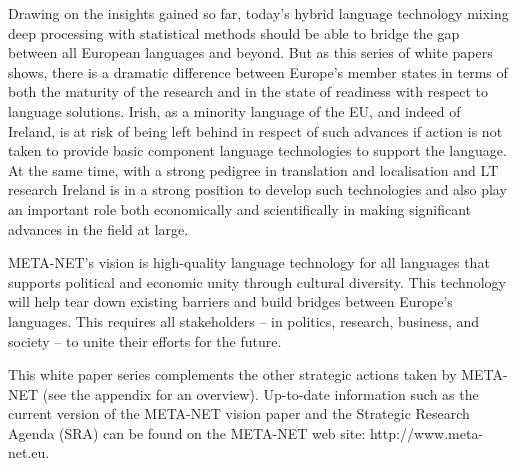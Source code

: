 \begin{multicols}{2}

Drawing on the insights gained so far, today’s hybrid language technology mixing deep processing with statistical methods should be able to bridge the gap between all European languages and beyond. But as this series of white papers shows, there is a dramatic difference between Europe's member states in terms of both the maturity of the research and in the state of readiness with respect to language solutions. Irish, as a minority language of the EU, and indeed of Ireland, is at risk of being left behind in respect of such advances if action is not taken to provide basic component language technologies to support the language. At the same time, with a strong pedigree in translation and localisation and LT research Ireland is in a strong position to develop such technologies and also play an important role both economically and scientifically in making significant advances in the field at large.

META-NET's vision is high-quality language technology for all languages that supports political and economic unity through cultural diversity. This technology will help tear down existing barriers and build bridges between Europe's languages. This requires all stakeholders -- in politics, research, business, and society -- to unite their efforts for the future.

This white paper series complements the other strategic actions taken by META-NET (see the appendix for an overview). Up-to-date information such as the current version of the META-NET vision paper \cite{Meta1} and the Strategic Research Agenda (SRA) can be found on the META-NET web site: http://www.meta-net.eu.
\end{multicols}

\clearpage


